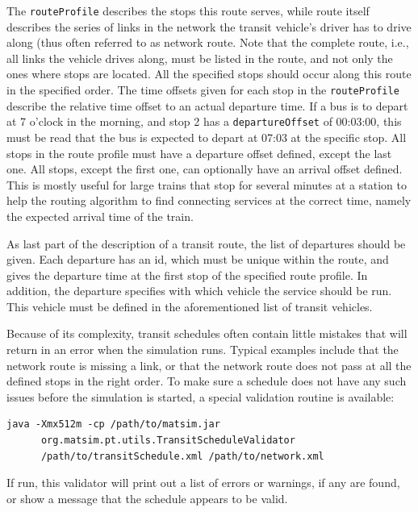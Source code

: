 The \lstinline|routeProfile| describes the stops this route serves, while route itself describes the series of links in the network the transit vehicle's driver has to drive along (thus often referred to as network route. Note that the complete route, i.e.,\,all links the vehicle drives along, must be listed in the route, and not only the ones where stops are located. All the specified stops should occur along this route in the specified order. The time offsets given for each stop in the \lstinline|routeProfile| describe the relative time offset to an actual departure time. If a bus is to depart at 7 o'clock in the morning, and stop 2 has a \lstinline|departureOffset| of 00:03:00, this must be read that the bus is expected to depart at 07:03 at the specific stop. All stops in the route profile must have a departure offset defined, except the last one. All stops, except the first one, can optionally have an arrival offset defined. This is mostly useful for large trains that stop for several minutes at a station to help the routing algorithm to find connecting services at the correct time, namely the expected arrival time of the train.

As last part of the description of a transit route, the list of departures should be given. Each departure has an id, which must be unique within the route, and gives the departure time at the first stop of the specified route profile. In addition, the departure specifies with which vehicle the service should be run. This vehicle must be defined in the aforementioned list of transit vehicles. 

Because of its complexity, transit schedules often contain little mistakes that will return in an error when the simulation runs. Typical examples include that the network route is missing a link, or that the network route does not pass at all the defined stops in the right order. To make sure a schedule does not have any such issues before the simulation is started, a special validation routine is available:

\begin{lstlisting}
java -Xmx512m -cp /path/to/matsim.jar  
      org.matsim.pt.utils.TransitScheduleValidator  
      /path/to/transitSchedule.xml /path/to/network.xml
\end{lstlisting}

If run, this validator will print out a list of errors or warnings, if any are found, or show a message that the schedule appears to be valid. 

